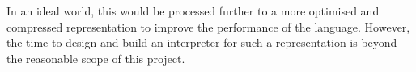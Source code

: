 \documentclass{l4proj}
\begin{document}
In an ideal world, this would be processed further to a more optimised and compressed representation to improve the performance of the language.
However, the time to design and build an interpreter for such a representation is beyond the reasonable scope of this project.


\end{document}
